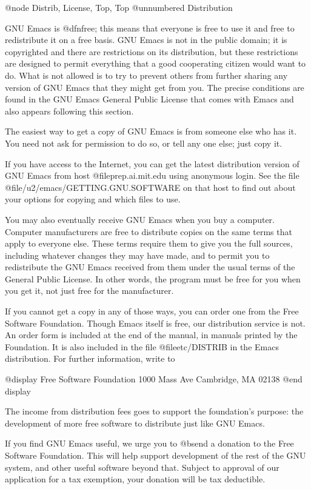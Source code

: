 @node Distrib, License, Top, Top
@unnumbered Distribution

GNU Emacs is @dfn{free}; this means that everyone is free to use it and
free to redistribute it on a free basis.  GNU Emacs is not in the public
domain; it is copyrighted and there are restrictions on its distribution,
but these restrictions are designed to permit everything that a good
cooperating citizen would want to do.  What is not allowed is to try to
prevent others from further sharing any version of GNU Emacs that they
might get from you.  The precise conditions are found in the GNU Emacs
General Public License that comes with Emacs and also appears following
this section.

The easiest way to get a copy of GNU Emacs is from someone else who has it.
You need not ask for permission to do so, or tell any one else; just copy
it.

If you have access to the Internet, you can get the latest distribution
version of GNU Emacs from host @file{prep.ai.mit.edu} using anonymous
login.  See the file @file{/u2/emacs/GETTING.GNU.SOFTWARE} on that host
to find out about your options for copying and which files to use.

You may also eventually receive GNU Emacs when you buy a computer.
Computer manufacturers are free to distribute copies on the same terms that
apply to everyone else.  These terms require them to give you the full
sources, including whatever changes they may have made, and to permit you
to redistribute the GNU Emacs received from them under the usual terms of
the General Public License.  In other words, the program must be free for
you when you get it, not just free for the manufacturer.

If you cannot get a copy in any of those ways, you can order one from the
Free Software Foundation.  Though Emacs itself is free, our distribution
service is not.  An order form is included at the end of the manual, in
manuals printed by the Foundation.  It is also included in the file
@file{etc/DISTRIB} in the Emacs distribution.  For further information,
write to

@display
Free Software Foundation
1000 Mass Ave
Cambridge, MA 02138
@end display

The income from distribution fees goes to support the foundation's
purpose: the development of more free software to distribute just like
GNU Emacs.

If you find GNU Emacs useful, we urge you to @b{send a donation} to the Free
Software Foundation.  This will help support development of the rest of the
GNU system, and other useful software beyond that.  Subject to approval of
our application for a tax exemption, your donation will be tax deductible.

